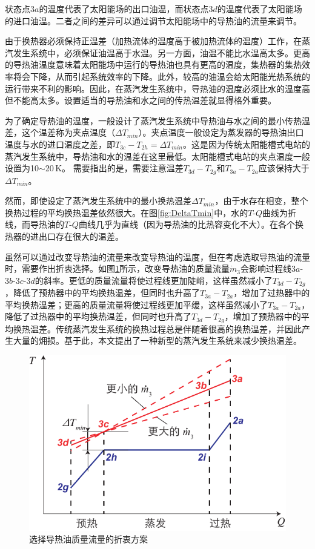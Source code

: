 状态点$3a$的温度代表了太阳能场的出口油温，而状态点$3d$的温度代表了太阳能场的进口油温。二者之间的差异可以通过调节太阳能场中的导热油的流量来调节。

由于换热器必须保持正温差（加热流体的温度高于被加热流体的温度）工作，在蒸汽发生系统中，必须保证油温高于水温。另一方面，油温不能比水温高太多。更高的导热油温度意味着太阳能场中运行的导热油也具有更高的温度，集热器的集热效率将会下降，从而引起系统效率的下降。此外，较高的油温会给太阳能光热系统的运行带来不利的影响。因此，在蒸汽发生系统中，导热油的温度必须比水的温度高但不能高太多。设置适当的导热油和水之间的传热温差就显得格外重要。

为了确定导热油的温度，一般设计了蒸汽发生系统中导热油与水之间的最小传热温差，这个温差称为夹点温度（$\Delta T_{min}$）。夹点温度一般设定为蒸发器的导热油出口温度与水的进口温度之差，即$T_{3c} - T_{2h} = \Delta T_{min}$。这是因为传统太阳能槽式电站的蒸汽发生系统中，导热油和水的温差在这里最低。太阳能槽式电站的夹点温度一般设置为10$\sim$20$\,\mathrm{K}$。
需要指出的是，需要注意温差$T_{3d} - T_{2g}$和$T_{3a} - T_{2a}$应该保持大于$\Delta T_{min}$。

然而，即使设定了蒸汽发生系统中的最小换热温差$\Delta T_{min}$，由于水存在相变，整个换热过程的平均换热温差依然很大。在图\ref{fig:DeltaTmin}中，水的$T$-$Q$曲线为折线，而导热油的$T$-$Q$曲线几乎为直线（因为导热油的比热容变化不大）。在各个换热器的进出口存在很大的温差。

虽然可以通过改变导热油的流量来改变导热油的温度，但在考虑选取导热油的流量时，需要作出折衷选择。如图\ref{fig:DeltaT}所示，改变导热油的质量流量$\dot{m}_3$会影响过程线$3a$-$3b$-$3c$-$3d$的斜率。更低的质量流量将使过程线更加陡峭，这样虽然减小了$T_{3d} - T_{2g}$，降低了预热器中的平均换热温差，但同时也升高了$T_{3a} - T_{2a}$，增加了过热器中的平均换热温差；更高的质量流量将使过程线更加平缓，这样虽然减小了$T_{3a} - T_{2a}$，降低了过热器中的平均换热温差，但同时也升高了$T_{3d} - T_{2g}$，增加了预热器中的平均换热温差。传统蒸汽发生系统的换热过程总是伴随着很高的换热温差，并因此产生大量的㶲损。基于此，本文提出了一种新型的蒸汽发生系统来减少换热温差。

\noindent \begin{figure}[htbp]
\begin{center}
	\includegraphics[width = 0.5\columnwidth]{fig/DeltaT}
	\caption{选择导热油质量流量的折衷方案}
	\label{fig:DeltaT}
\end{center}
\end{figure}

